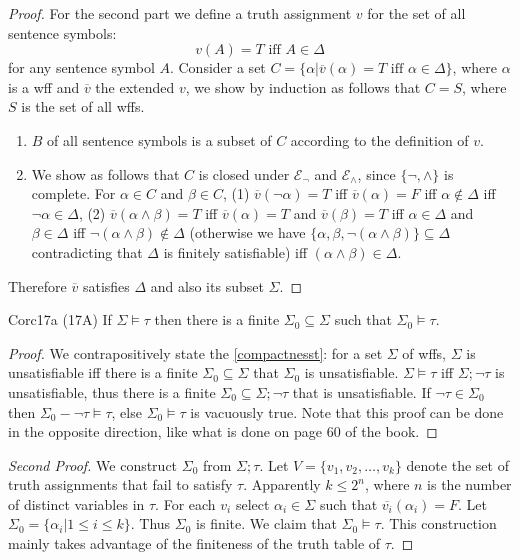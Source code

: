 \begin{proof}
  For the second part we define a truth assignment $v$ for the set of all sentence symbols:
  \[
    v(A)=T\text{ iff }A\in \Delta
  \]
  for any sentence symbol $A$. Consider a set $C=\{\alpha|\overline{v}(\alpha)=T\text{ iff }\alpha\in \Delta\}$, where $\alpha$ is a wff and $\overline{v}$ the extended $v$, we show by induction as follows that $C=S$, where $S$ is the set of all wffs.
  \begin{enumerate}
    \item $B$ of all sentence symbols is a subset of $C$ according to the definition of $v$.
    \item We show as follows that $C$ is closed under $\mathcal{E}_{\neg}$ and $\mathcal{E}_{\wedge}$, since $\{\neg,\wedge\}$ is complete. For $\alpha\in C$ and $\beta\in C$, (1) $\overline{v}(\neg\alpha)=T$ iff $\overline{v}(\alpha)=F$ iff $\alpha\notin \Delta$ iff $\neg \alpha\in \Delta$, (2) $\overline{v}(\alpha\wedge \beta)=T$ iff $\overline{v}(\alpha)=T$ and $\overline{v}(\beta)=T$ iff $\alpha\in \Delta$ and $\beta\in \Delta$ iff $\neg(\alpha\wedge \beta)\notin \Delta$ (otherwise we have $\{\alpha,\beta,\neg(\alpha\wedge \beta)\}\subseteq \Delta$ contradicting that $\Delta$ is finitely satisfiable) iff $(\alpha\wedge\beta)\in \Delta$.
  \end{enumerate}
  Therefore $\overline{v}$ satisfies $\Delta$ and also its subset $\Sigma$.
\end{proof}

\begin{reference}{Cor}{c17a}
  (17A) If $\Sigma\vDash \tau$ then there is a finite $\Sigma_0\subseteq \Sigma$ such that $\Sigma_0\vDash \tau$.
\end{reference}

\begin{proof}
  We contrapositively state the \ref{compactnesst}: for a set $\Sigma$ of wffs, $\Sigma$ is unsatisfiable iff there is a finite $\Sigma_0\subseteq \Sigma$ that $\Sigma_0$ is unsatisfiable. $\Sigma\vDash \tau$ iff $\Sigma;\neg \tau$ is unsatisfiable, thus there is a finite $\Sigma_0\subseteq \Sigma;\neg\tau$ that is unsatisfiable. If $\neg\tau\in \Sigma_0$ then $\Sigma_0-\neg\tau\vDash \tau$, else $\Sigma_0\vDash \tau$ is vacuously true. Note that this proof can be done in the opposite direction, like what is done on page 60 of the book.
\end{proof}

\begin{proof}[Second Proof]
  We construct $\Sigma_0$ from $\Sigma;\tau$. Let $V=\{v_1,v_2,\dots,v_k\}$ denote the set of truth assignments that fail to satisfy $\tau$. Apparently $k\leq2^n$, where $n$ is the number of distinct variables in $\tau$. For each $v_i$ select $\alpha_i\in \Sigma$ such that $\overline{v_i}(\alpha_i)=F$. Let $\Sigma_0=\{\alpha_i|1\leq i\leq k\}$. Thus $\Sigma_0$ is finite. We claim that $\Sigma_0\vDash \tau$. This construction mainly takes advantage of the finiteness of the truth table of $\tau$.
\end{proof}

